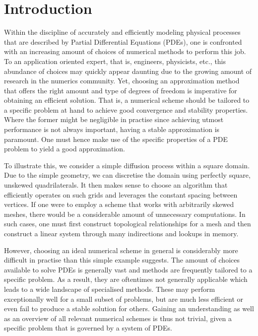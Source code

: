 \documentclass[sn-mathphys,Numbered]{sn-jnl}%
\theoremstyle{thmstyleone}%
\theoremstyle{thmstyletwo}%
\theoremstyle{thmstylethree}%
\begin{document}
\section{Introduction}\label{sec:introduction}

Within the discipline of accurately and efficiently modeling physical processes that are described by Partial Differential Equations (PDEs), one is confronted with an increasing amount of choices of numerical methods to perform this job.
To an application oriented expert, that is, engineers, physicists, etc., this abundance of choices may quickly appear daunting due to the growing amount of research in the numerics community.
Yet, choosing an approximation method that offers the right amount and type of degrees of freedom is imperative for obtaining an efficient solution.
That is, a numerical scheme should be tailored to a specific problem at hand to achieve good convergence and stability properties.
Where the former might be negligible in practise since achieving utmost performance is not always important, having a stable approximation is paramount.
One must hence make use of the specific properties of a PDE problem to yield a good approximation.

To illustrate this, we consider a simple diffusion process within a square domain.
Due to the simple geometry, we can discretise the domain using perfectly square, unskewed quadrilaterals.
It then makes sense to choose an algorithm that efficiently operates on such grids and leverages the constant spacing between vertices.
If one were to employ a scheme that works with arbitrarily skewed meshes, there would be a considerable amount of unnecessary computations.
In such cases, one must first construct topological relationships for a mesh and then construct a linear system through many indirections and lookups in memory.

However, choosing an ideal numerical scheme in general is considerably more difficult in practise than this simple example suggests.
The amount of choices available to solve PDEs is generally vast and methods are frequently tailored to a specific problem. 
As a result, they are oftentimes not generally applicable which leads to a wide landscape of specialised methods.
These may perform exceptionally well for a small subset of problems, but are much less efficient or even fail to produce a stable solution for others.
Gaining an understanding as well as an overview of all relevant numerical schemes is thus not trivial, given a specific problem that is governed by a system of PDEs.
\end{document}
